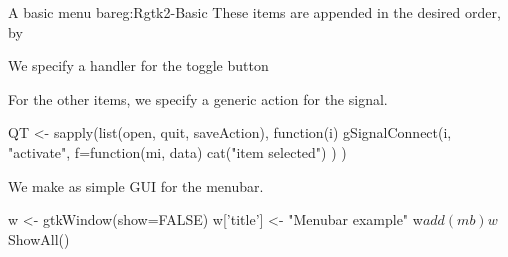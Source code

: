 \begin{example}{A basic menu bar}{eg:Rgtk2-Basic}
These items are appended in the desired order, by
\begin{Schunk}
\end{Schunk}
We specify a handler for the toggle button
\begin{Schunk}
\end{Schunk}
For the other  items, we specify a generic action for the  signal.
\begin{Schunk}
\begin{Sinput}
 QT <- sapply(list(open, quit, saveAction), function(i) 
        gSignalConnect(i, "activate", f=function(mi, data) {
          cat("item selected\n")
        })
        )
\end{Sinput}
\end{Schunk}

We make as simple GUI for the menubar.
\begin{Schunk}
\begin{Sinput}
 w <- gtkWindow(show=FALSE)
 w['title'] <- "Menubar example"
 w$add(mb)
 w$ShowAll()
\end{Sinput}
\end{Schunk}
\end{example}

